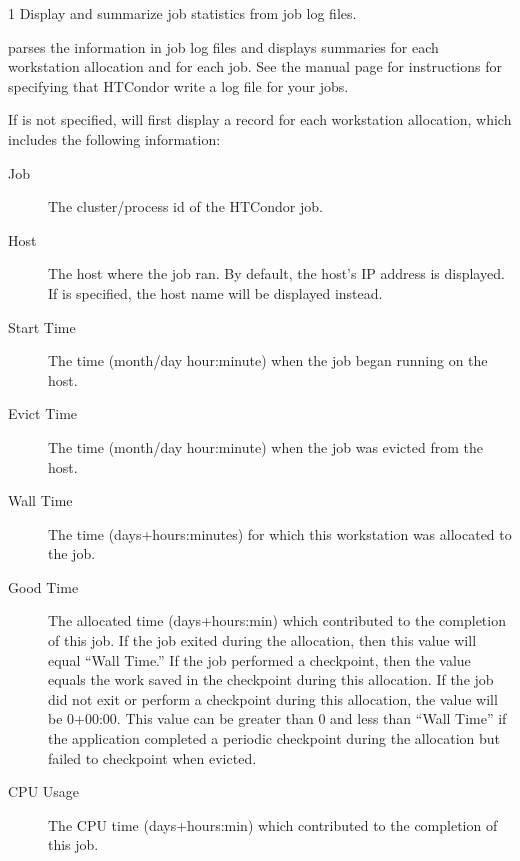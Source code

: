 \begin{ManPage}{\label{man-condor-userlog}}{1}
{Display and summarize job statistics from job log files.}

\Synopsis {}

\Description
{} parses the information in job log files and displays
summaries for each workstation allocation and for each job.  See the
 manual page for
instructions for specifying that HTCondor write a log file for your
jobs.

If  is not specified,  will first display
a record for each workstation allocation, which includes the following
information:

\begin{description}
\item[Job] The cluster/process id of the HTCondor job.
\item[Host] The host where the job ran.  By default, the host's IP
address is displayed.  If  is specified, the host name
will be displayed instead.
\item[Start Time] The time (month/day hour:minute) when the job began
running on the host.
\item[Evict Time] The time (month/day hour:minute) when
the job was evicted from the host.
\item[Wall Time] The time (days+hours:minutes) for which this workstation was
allocated to the job.
\item[Good Time] The allocated time (days+hours:min) which
contributed to the completion of this job.  If the job exited during
the allocation, then this value will equal ``Wall Time.''  If the job
performed a checkpoint, then the value equals the work saved in
the checkpoint during this allocation.  If the job did not exit or
perform a checkpoint during this allocation, the value will be 0+00:00.
This value can be greater than 0 and less than ``Wall Time'' if the
application completed a periodic checkpoint during the allocation but
failed to checkpoint when evicted.
\item[CPU Usage] The CPU time (days+hours:min) which contributed to
the completion of this job.
\end{description}


\end{ManPage}
